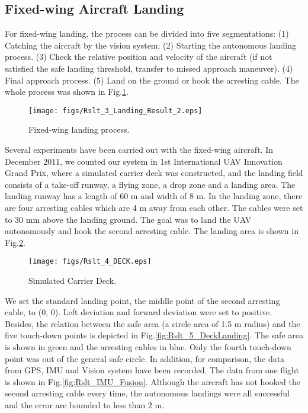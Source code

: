 \documentclass[letterpaper, 10 pt, conference]{ieeeconf}  %
\begin{document}
\subsection{Fixed-wing Aircraft Landing}
For fixed-wing landing, the process can be divided into five segmentations: (1) Catching the aircraft by the vision system; (2) Starting the autonomous landing process. (3) Check the relative position and velocity of the aircraft (if not satisfied the safe landing threshold, transfer to missed approach maneuver). (4) Final approach process. (5) Land on the ground or hook the arresting cable. The whole process was shown in Fig.\ref{fig:Rslt_3_Landing_Result}.
   \begin{figure}[!tb]
      \centering
      \texttt{[image: figs/Rslt\_3\_Landing\_Result\_2.eps]}
      \caption{Fixed-wing landing process.}
      \label{fig:Rslt_3_Landing_Result}
   \end{figure}
Several experiments have been carried out with the fixed-wing aircraft. In December 2011, we counted our system in 1st International UAV Innovation Grand Prix, where a simulated carrier deck was constructed, and the landing field consists of a take-off runway, a flying zone, a drop zone and a landing area. The landing runway has a length of 60 m and width of 8 m. In the landing zone, there are four arresting cables which are 4 m away from each other. The cables were set to 30 mm above the landing ground. The goal was to land the UAV autonomously and hook the second arresting cable. The landing area is shown in Fig.\ref{fig:Rslt_4_DECK}.
   \begin{figure}[!tb]
      \centering
      \texttt{[image: figs/Rslt\_4\_DECK.eps]}
      \caption{Simulated Carrier Deck.}
      \label{fig:Rslt_4_DECK}
   \end{figure}
We set the standard landing point, the middle point of the second arresting cable, to (0, 0). Left deviation and forward deviation were set to positive. Besides, the relation between the safe area (a circle area of 1.5 m radius) and the five touch-down points is depicted in Fig.\ref{fig:Rslt_5_DeckLanding}. The safe area is shown in green and the arresting cables in blue. Only the fourth touch-down point was out of the general safe circle. In addition, for comparison, the data from GPS, IMU and Vision system have been recorded. The data from one flight is shown in Fig.\ref{fig:Rslt_IMU_Fusion}. Although the aircraft has not hooked the second arresting cable every time, the autonomous landings were all successful and the error are bounded to less than 2 m. 
\end{document}
